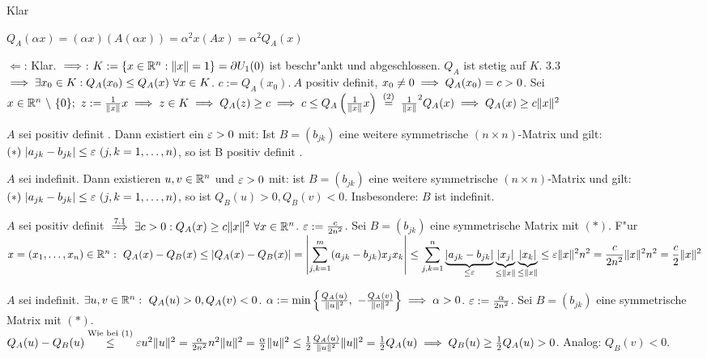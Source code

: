 \documentclass[a4paper,twoside,DIV15,BCOR12mm,chapterprefix=true,headings=twolinechapter]{scrbook}
\begin{document}
\begin{beweise}
\item Klar
\item $Q_A(\alpha x)=(\alpha x)(A(\alpha x))=\alpha^2x(Ax)=\alpha^2Q_A(x)$
\item \glqq$\Leftarrow$\grqq: Klar. \glqq$\implies$\grqq: $K:=\{x\in\mathbb{R}^n: \|x\|=1\}=\partial U_1(0)$ ist beschr"ankt und abgeschlossen. $Q_A$ ist stetig auf $K$. 3.3 $\implies\exists x_0\in K: Q_A(x_0)\le Q_A(x)\ \forall x\in K$. $c:=Q_A(x_0).\ A$ positiv definit, $x_0\ne 0\implies Q_A(x_0)=c>0$. Sei $x\in\MdR^n\ \backslash\ \{0\};\ z:=\frac{1}{\|x\|}x\folgt z\in K\folgt Q_A(z)\ge c\folgt c \le Q_A\left(\frac{1}{\|x\|}x\right)\gleichnach{(2)}\frac{1}{\|x\|}^2Q_A(x)\folgt Q_A(x)\ge c\|x\|^2$
\end{beweise}

\begin{satz}
\begin{liste}
\item $A$ sei positiv definit . Dann existiert ein $\varepsilon>0$ mit: Ist $B=(b_{jk})$ eine weitere symmetrische $(n\times n)$-Matrix und gilt: $(*)\ |a_{jk}-b_{jk}|\le\ep\ (j,k=1,\ldots, n)$, so ist B positiv definit .
\item $A$ sei indefinit. Dann existieren $u,v\in\mathbb{R}^n$ und $\varepsilon>0$ mit: ist $B=(b_{jk})$ eine weitere symmetrische $(n\times n)$-Matrix und gilt: $(*)\ |a_{jk}-b_{jk}|\le\ep\ (j,k=1,\ldots,n)$, so ist $Q_B(u)>0, Q_B(v)<0$. Insbesondere: $B$ ist indefinit.
\end{liste}
\end{satz}

\begin{beweise}
\item $A$ sei positiv definit $\folgtnach{7.1}\exists c>0: Q_A(x)\ge c\|x\|^2\ \forall x\in\MdR^n$. $\varepsilon:=\frac{c}{2n^2}$. Sei $B=(b_{jk})$ eine symmetrische Matrix mit $(*)$. F"ur $x=(x_1,\ldots,x_n)\in\MdR^n:\ Q_A(x)-Q_B(x)\le|Q_A(x)-Q_B(x)|=\left|\ds\sum_{j,k=1}^m(a_{jk}-b_{jk})x_jx_k\right|\le\ds\sum_{j,k=1}^n\underbrace{|a_{jk}-b_{jk}|}_{\le\ep}\underbrace{|x_j|}_{\le\|x\|}\underbrace{|x_k|}_{\le\|x\|}\le\ep\|x\|^2n^2=\frac{c}{2n^2}\|x\|^2n^2=\frac{c}{2}\|x\|^2$
\item $A$ sei indefinit. $\exists u,v\in\MdR^n:\ Q_A(u)>0, Q_A(v)<0$. $\alpha:=\min\left\{\frac{Q_A(u)}{\|u\|^2},\ -\frac{Q_A(v)}{\|v\|^2}\right\}\folgt\alpha>0$. $\varepsilon:=\frac{\alpha}{2n^2}$. Sei $B=(b_{jk})$ eine symmetrische Matrix mit $(*)$.\\
$Q_A(u)-Q_B(u)\overset{\text{Wie bei (1)}}{\le}\varepsilon u^2\|u\|^2=\frac{\alpha}{2n^2}n^2\|u\|^2=\frac{\alpha}{2}\|u\|^2\le\frac{1}{2}\frac{Q_A(u)}{\|u\|^2}\|u\|^2=\frac{1}{2}Q_A(u) \implies Q_B(u)\ge\frac{1}{2}Q_A(u)>0$. Analog: $Q_B(v)<0$.
\end{beweise}
\end{document}
